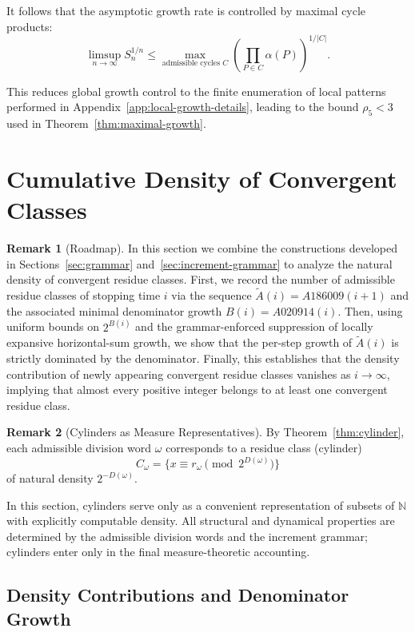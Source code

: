 \documentclass[12pt, oneside]{article}   	%
\numberwithin{equation}{section}          %
\theoremstyle{definition}
\newtheorem*{remark}{Remark}
\begin{document}
It follows that the asymptotic growth rate is controlled by
maximal cycle products:
\[
\limsup_{n\to\infty} S_n^{1/n}
\le
\max_{\text{admissible cycles } C}
\left( \prod_{P\in C} \alpha(P) \right)^{1/|C|}.
\]

This reduces global growth control to the finite enumeration of local
patterns performed in Appendix~\ref{app:local-growth-details}, leading to
the bound $\rho_5<3$ used in Theorem~\ref{thm:maximal-growth}.


\newpage
\section{Cumulative Density of Convergent Classes}
\label{sec:cumulative-density}

\begin{remark}[Roadmap]
In this section we combine the constructions developed in Sections~\ref{sec:grammar}
and~\ref{sec:increment-grammar} to analyze the natural density of convergent residue
classes. First, we record the number of admissible residue classes of stopping time
\(i\) via the sequence \(\widetilde A(i) = A186009(i+1)\) and the associated minimal
denominator growth \(B(i) = A020914(i)\). Then, using uniform bounds on \(2^{B(i)}\)
and the grammar-enforced suppression of locally expansive horizontal-sum growth, we show
that the per-step growth of \(\widetilde A(i)\) is strictly dominated by the denominator.
Finally, this establishes that the density contribution of newly appearing convergent
residue classes vanishes as \(i\to\infty\), implying that almost every positive integer
belongs to at least one convergent residue class.
\end{remark}

\begin{remark}[Cylinders as Measure Representatives]
By Theorem~\ref{thm:cylinder}, each admissible division word $\omega$
corresponds to a residue class (cylinder)
\[
C_\omega = \{x \equiv r_\omega \pmod{2^{D(\omega)}}\}
\]
of natural density $2^{-D(\omega)}$.

In this section, cylinders serve only as a convenient representation
of subsets of $\mathbb{N}$ with explicitly computable density.
All structural and dynamical properties are determined by the
admissible division words and the increment grammar; cylinders
enter only in the final measure-theoretic accounting.
\end{remark}


\subsection{Density Contributions and Denominator Growth}
\end{document}
